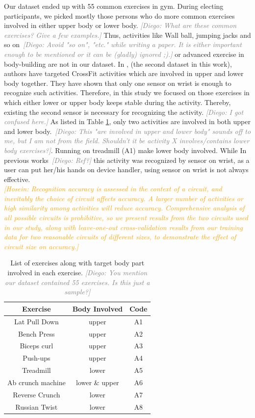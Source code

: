 \documentclass[journal,article,submit,moreauthors,pdftex]{Definitions/mdpi}
\newcommand{\hosein}[1]{\textcolor{orange}{{\it [Hosein: #1]}}}
\newcommand{\diego}[1]{\textcolor{gray}{{\it [Diego: #1]}}}
\begin{document}
Our dataset ended up with 55 common exercises in gym. During electing participants, we picked mostly those persons who do more common exercises involved in either upper body or lower body. \diego{What are these common exercises? Give a few examples.}
Thus, activities like Wall ball, jumping jacks and so on~\diego{Avoid "so on", "etc." while writing a paper. It is either important enough to be mentioned or it can be (gladly) ignored ;).} or advanced exercise in body-building are not in our dataset. In \cite{soro2019recognition}, (the second dataset in this work), authors have targeted CrossFit activities which are involved in upper and lower body together. They have shown that only one sensor on wrist is enough to recognize such activities. Therefore, in this study we focused on those exercises in which either lower or upper body keeps stable during the activity. Thereby, existing the second sensor is necessary for recognizing the activity. \diego{I got confused here.} As listed in Table \ref{activity_list}, only two activities are involved in both upper and lower body.~\diego{This "are involved in upper and lower body" sounds off to me, but I am not from the field. Shouldn't it be activity X involves/contains lower body exercises?}. Running on treadmill (A1) make lower body involved. While In previous works~\diego{Ref?} this activity was recognized by sensor on wrist, as a user can put her/his hands on device handler, using sensor on wrist is not always effective. \\
\hosein{Recognition accuracy is assessed in the context of a circuit, and inevitably the choice of circuit affects accuracy. A larger number of activities or high similarity among activities will reduce accuracy. Comprehensive analysis of all possible circuits is prohibitive, so we present results from the two circuits used in our study, along with leave-one-out cross-validation results from our training data for two reasonable circuits of different sizes, to demonstrate the effect of circuit size on accuracy.}
\begin{table}[H]
	\caption{List of exercises along with target body part involved in each exercise. \diego{You mention our dataset contained 55 exercises. Is this just a sample?}}
	\centering
	\begin{tabular}{ccc}
		\toprule
		\textbf{Exercise}	& \textbf{Body Involved}	& \textbf{Code}\\
		\midrule
		Lat Pull Down		& upper 		& A1\\
		Bench Press		& upper 			& A2\\
		Biceps curl		& upper			& A3\\
		Push-ups & upper			& A4\\
		Treadmill		& lower 			& A5\\
		Ab crunch machine		& lower \& upper & A6\\
		Reverse Crunch & lower			& A7 \\
		Russian Twist & lower			& A8 \\
		\bottomrule
	\end{tabular}
\label{activity_list}
\end{table}
\end{document}
